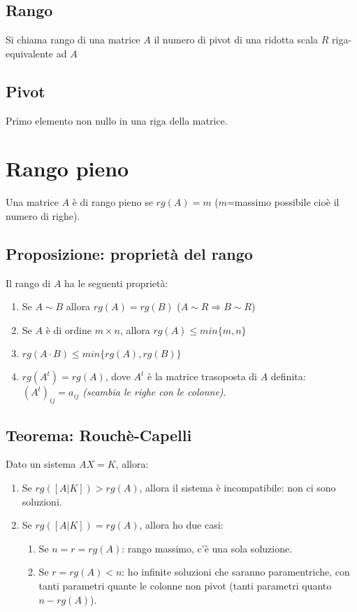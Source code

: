 \subsection{Rango}
Si chiama rango di una matrice \(A\) il numero di pivot di una ridotta scala \(R\) riga-equivalente ad \(A\)

\subsection{Pivot}
Primo elemento non nullo in una riga della matrice.

\section{Rango pieno}
Una matrice \(A\) è di rango pieno se \(rg(A)=m\) (\(m\)=massimo possibile cioè il numero di righe).

\subsection{Proposizione: proprietà del rango}
Il rango di \(A\) ha le seguenti proprietà:

\begin{enumerate}
	\item Se \(A\sim B\) allora \(rg(A)=rg(B)\) (\(A\sim R\Rightarrow B\sim R\))
	\item Se \(A\) è di ordine \(m\times n\), allora \(rg(A)\leq min\{m,n\}\)
	\item \(rg(A\cdot B)\leq min\{rg(A),rg(B)\}\)
	\item \(rg(A^t)=rg(A)\), dove \(A^t\) è la matrice trasoposta di \(A\) definita: \((A^t)_{ij}=a_{ij}\) \textit{(scambia le righe con le colonne)}.
\end{enumerate} 

\subsection{Teorema: Rouchè-Capelli}
Dato un sistema \(AX=K\), allora:
\begin{enumerate}
	\item Se \(rg([A|K])>rg(A)\), allora il sistema è incompatibile: non ci sono soluzioni.
	\item Se \(rg([A|K])=rg(A)\), allora ho due casi:

	\begin{enumerate}
		\item Se \(n=r=rg(A)\): rango massimo, c'è una sola soluzione.
		\item Se \(r=rg(A)<n\): ho infinite soluzioni che saranno paramentriche, con tanti parametri quante le colonne non pivot (tanti parametri quanto \(n-rg(A)\)).
	\end{enumerate}	
	
\end{enumerate}